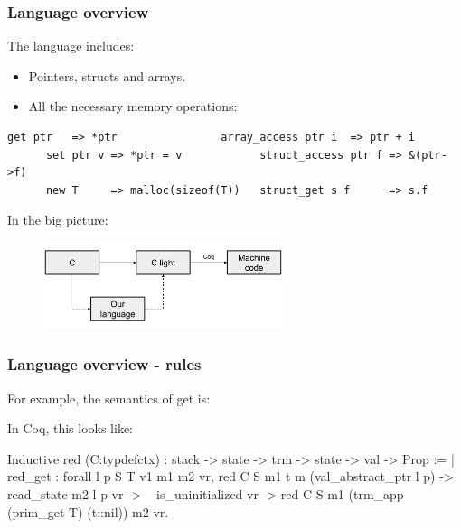 \begin{frame}[fragile]
\frametitle{Language overview}

The language includes:
\begin{itemize}
	\item Pointers, structs and arrays.
	\item All the necessary memory operations:
\end{itemize}

\begin{Verbatim}[fontsize=\scriptsize]
      get ptr   => *ptr                array_access ptr i  => ptr + i
      set ptr v => *ptr = v            struct_access ptr f => &(ptr->f)
      new T     => malloc(sizeof(T))   struct_get s f      => s.f
\end{Verbatim}

\bigskip

In the big picture:

\begin{figure}[H]
\centering
\includegraphics[width=7cm]{images/compcert_our_language}
\end{figure}

\end{frame}


\begin{frame}[fragile]
\frametitle{Language overview - rules}

For example, the semantics of get is:
\begin{center}
  \begin{prooftree}
  \end{prooftree}
\end{center}

In Coq, this looks like:

\begin{coqs}
Inductive red (C:typdefctx) : stack -> state -> trm -> state -> val -> Prop :=
  | red_get : forall l p S T v1 m1 m2 vr,
      red C S m1 t m (val_abstract_ptr l p) ->
      read_state m2 l p vr ->
      ~ is_uninitialized vr ->
      red C S m1 (trm_app (prim_get T) (t::nil)) m2 vr.
\end{coqs}

\end{frame}


